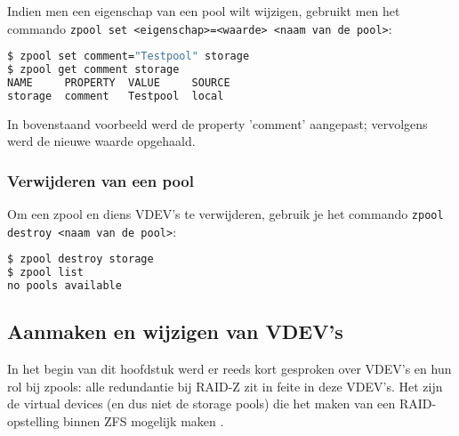 Indien men een eigenschap van een pool wilt wijzigen, gebruikt men het commando \texttt{zpool set <eigenschap>=<waarde> <naam van de pool>}: 

\begin{lstlisting}[language=bash,style=command_style]
$ zpool set comment="Testpool" storage
$ zpool get comment storage
NAME     PROPERTY  VALUE     SOURCE
storage  comment   Testpool  local
\end{lstlisting}

In bovenstaand voorbeeld werd de property 'comment' aangepast; vervolgens werd de nieuwe waarde opgehaald.

\subsubsection{Verwijderen van een pool}

Om een zpool en diens VDEV's te verwijderen, gebruik je het commando \texttt{zpool destroy <naam van de pool>}:

\begin{lstlisting}[language=bash,style=command_style]
$ zpool destroy storage
$ zpool list
no pools available
\end{lstlisting}



\subsection{Aanmaken en wijzigen van VDEV's}

In het begin van dit hoofdstuk werd er reeds kort gesproken over VDEV's en hun rol bij zpools: alle redundantie bij RAID-Z zit in feite in deze VDEV's. Het zijn de virtual devices (en dus niet de storage pools) die het maken van een RAID-opstelling binnen ZFS mogelijk maken \autocite{Lucas2015}.


